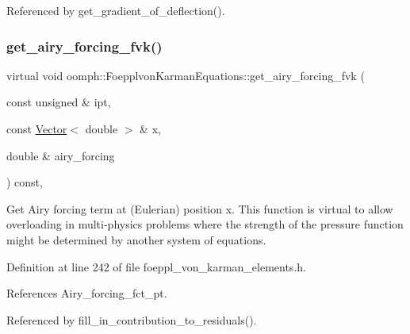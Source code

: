 Referenced by get\+\_\+gradient\+\_\+of\+\_\+deflection().

\mbox{\label{classoomph_1_1FoepplvonKarmanEquations_a53427868998e64141f9a2c937844053a}} 
\subsubsection{\texorpdfstring{get\+\_\+airy\+\_\+forcing\+\_\+fvk()}{get\_airy\_forcing\_fvk()}}
{\footnotesize\ttfamily virtual void oomph\+::\+Foepplvon\+Karman\+Equations\+::get\+\_\+airy\+\_\+forcing\+\_\+fvk (\begin{DoxyParamCaption}\item[{const unsigned \&}]{ipt,  }\item[{const \hyperlink{classoomph_1_1Vector}{Vector}$<$ double $>$ \&}]{x,  }\item[{double \&}]{airy\+\_\+forcing }\end{DoxyParamCaption}) const\hspace{0.3cm}{\ttfamily [inline]}, {\ttfamily [virtual]}}



Get Airy forcing term at (Eulerian) position x. This function is virtual to allow overloading in multi-\/physics problems where the strength of the pressure function might be determined by another system of equations. 



Definition at line 242 of file foeppl\+\_\+von\+\_\+karman\+\_\+elements.\+h.



References Airy\+\_\+forcing\+\_\+fct\+\_\+pt.



Referenced by fill\+\_\+in\+\_\+contribution\+\_\+to\+\_\+residuals().

\mbox{\label{classoomph_1_1FoepplvonKarmanEquations_a6fa390e13fa36ed3f4fe24bfe79af008}} 
